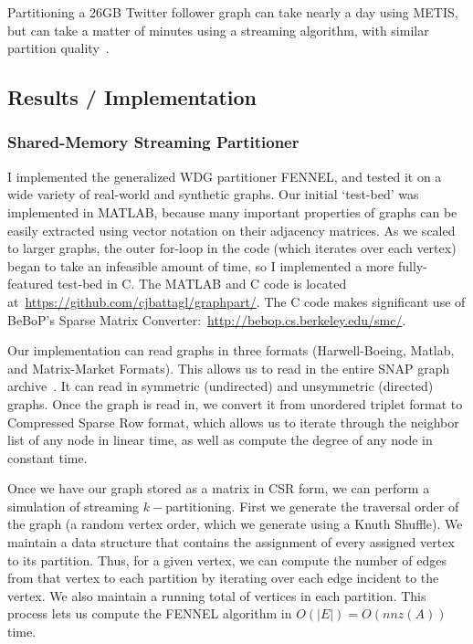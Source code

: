 \documentclass[11pt]{article}
\begin{document}
Partitioning a 26GB Twitter follower graph can take nearly a day using METIS, but can take a matter of minutes using a streaming algorithm, with similar partition quality~\cite{tsourakakis2012fennel}. 

\subsection{Results / Implementation}
\subsubsection{Shared-Memory Streaming Partitioner}

I implemented the generalized WDG partitioner FENNEL, and tested it on a wide variety of real-world and synthetic graphs. Our initial `test-bed' was implemented in MATLAB, because many important properties of graphs can be easily extracted using vector notation on their adjacency matrices. As we scaled to larger graphs, the outer for-loop in the code (which iterates over each vertex) began to take an infeasible amount of time, so I implemented a more fully-featured test-bed in C. The MATLAB and C code is located at~\url{https://github.com/cjbattagl/graphpart/}. The C code makes significant use of BeBoP's Sparse Matrix Converter:~\url{http://bebop.cs.berkeley.edu/smc/}.

Our implementation can read graphs in three formats (Harwell-Boeing, Matlab, and Matrix-Market Formats). This allows us to read in the entire SNAP graph archive~\cite{Leskovec-data}. It can read in symmetric (undirected) and unsymmetric (directed) graphs. Once the graph is read in, we convert it from unordered triplet format to Compressed Sparse Row format, which allows us to iterate through the neighbor list of any node in linear time, as well as compute the degree of any node in constant time.

Once we have our graph stored as a matrix in CSR form, we can perform a simulation of streaming $k-$partitioning. First we generate the traversal order of the graph (a random vertex order, which we generate using a Knuth Shuffle). We maintain a data structure that contains the assignment of every assigned vertex to its partition. Thus, for a given vertex, we can compute the number of edges from that vertex to each partition by iterating over each edge incident to the vertex. We also maintain a running total of vertices in each partition. This process lets us compute the FENNEL algorithm in $O(|E|)=O(nnz(A))$ time. 
\end{document}
